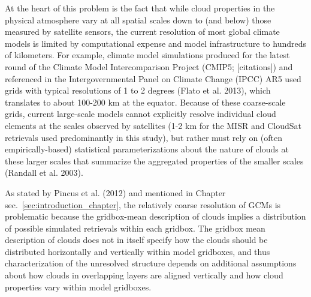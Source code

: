 At the heart of this problem is the fact that while cloud properties in
the physical atmosphere vary at all spatial scales down to (and below)
those measured by satellite sensors, the current resolution of most
global climate models is limited by computational expense and model
infrastructure to hundreds of kilometers. For example, climate model
simulations produced for the latest round of the Climate Model
Intercomparison Project (CMIP5; {[}citations{]}) and referenced in the
Intergovernmental Panel on Climate Change (IPCC) AR5 used grids with
typical resolutions of 1 to 2 degrees (Flato et al. 2013), which
translates to about 100-200 km at the equator. Because of these
coarse-scale grids, current large-scale models cannot explicitly resolve
individual cloud elements at the scales observed by satellites (1-2 km
for the MISR and CloudSat retrievals used predominantly in this study),
but rather must rely on (often empirically-based) statistical
parameterizations about the nature of clouds at these larger scales that
summarize the aggregated properties of the smaller scales (Randall et
al. 2003).

As stated by Pincus et al. (2012) and mentioned in Chapter
sec.~\ref{sec:introduction_chapter}, the relatively coarse resolution of
GCMs is problematic because the gridbox-mean description of clouds
implies a distribution of possible simulated retrievals within each
gridbox. The gridbox mean description of clouds does not in itself
specify how the clouds should be distributed horizontally and vertically
within model gridboxes, and thus characterization of the unresolved
structure depends on additional assumptions about how clouds in
overlapping layers are aligned vertically and how cloud properties vary
within model gridboxes.

